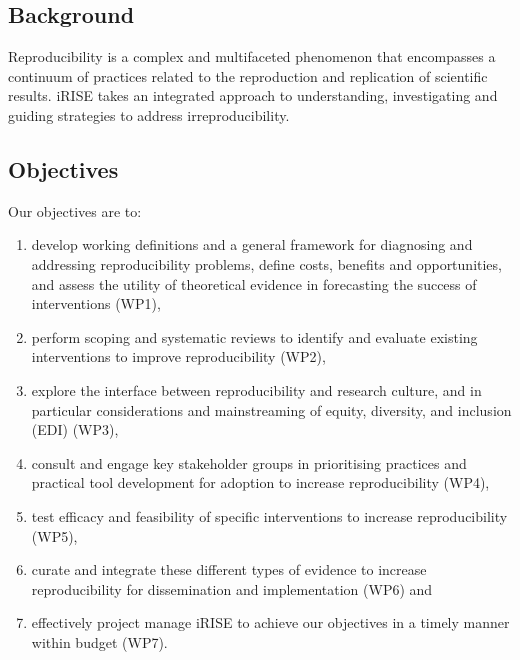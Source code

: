 \documentclass[
]{article}
\providecommand{\tightlist}{%
  \setlength{\itemsep}{0pt}\setlength{\parskip}{0pt}}
\begin{document}
\hypertarget{background}{%
\subsection{Background}\label{background}}

Reproducibility is a complex and multifaceted phenomenon that encompasses a continuum of practices related to the reproduction and replication of scientific results. iRISE takes an integrated approach to understanding, investigating and guiding strategies to address irreproducibility.

\hypertarget{objectives}{%
\subsection{Objectives}\label{objectives}}

Our objectives are to:

\begin{enumerate}
\def\labelenumi{\arabic{enumi}.}
\tightlist
\item
  develop working definitions and a general framework for diagnosing and addressing reproducibility problems, define costs, benefits and opportunities, and assess the utility of theoretical evidence in forecasting the success of interventions (WP1),\\
\item
  perform scoping and systematic reviews to identify and evaluate existing interventions to improve reproducibility (WP2),\\
\item
  explore the interface between reproducibility and research culture, and in particular considerations and mainstreaming of equity, diversity, and inclusion (EDI) (WP3),\\
\item
  consult and engage key stakeholder groups in prioritising practices and practical tool development for adoption to increase reproducibility (WP4),\\
\item
  test efficacy and feasibility of specific interventions to increase reproducibility (WP5),\\
\item
  curate and integrate these different types of evidence to increase reproducibility for dissemination and implementation (WP6) and\\
\item
  effectively project manage iRISE to achieve our objectives in a timely manner within budget (WP7).
\end{enumerate}
\end{document}
